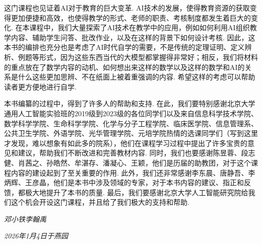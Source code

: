 这门课程也见证着AI对于教育的巨大变革. AI技术的发展，使得教育资源的获取变得更加便捷和高效，也使得教学的形式、老师的职责、考核制度都发生着巨大的变化. 在本课程中，我们大量探索了AI技术在教学中的应用，例如如何利用AI组织教学内容、辅助学生问答、批改作业，以及在这样的背景下如何设计考核. 因此，这本书的编排也充分也是考虑了AI时代自学的需要，不是传统的定理证明、定义辨析、例题等形式，因为这些东西当代的大模型都掌握得非常好；相反，我们将材料的重点放在了数学内容的动机、如何想出来这样的数学以及这样的数学和AI的关系是什么这些更加思辨、不在纸面上被着重强调的内容. 希望这样的考虑可以帮助读者更方便地进行自学. 

本书编纂的过程中，得到了许多人的帮助和支持. 在此，我们要特别感谢北京大学通用人工智能实验班的2019级到2023级的各位同学们以及来自信息科学技术学院、数学科学学院、生命科学学院、化学与分子工程学院、临床医学院、信息管理系、公共卫生学院、外语学院、光华管理学院、元培学院热情的选课同学们（写到这里才发现，难以想象有如此多的院系），他们在课程学习过程中提出了许多宝贵的意见和建议，帮助我们不断改进和完善教材内容. 同时，我们也要感谢陈昱蓉、段志健、肖茜之、孙皓然、牟湛存、潘凝心、王颖，他们是历届的助教团，对于这个课程内容的建设起到了至关重要的作用. 此外，我们还非常感谢李东晨、唐静吾、李炳辉、王彦晶，他们是本书中涉及领域的专家，对于本书内容的建议、指正和反馈，都极大地提升了本书的质量. 最后，我们要感谢北京大学人工智能研究院给我们这个机会开设这门课程，并且给了我们极大的支持和帮助. 

{
\raggedleft\textit{邓小铁\quad 李翰禹}

\raggedleft\textit{2026年1月4日\quad 于燕园}

}